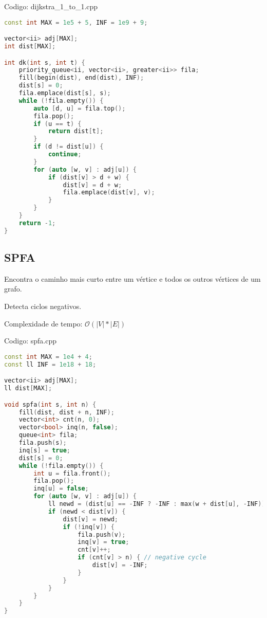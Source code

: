 \documentclass[10pt, a4paper, oneside]{book}
\begin{document}
Codigo: dijkstra\_1\_to\_1.cpp

\begin{lstlisting}[language=C++]
const int MAX = 1e5 + 5, INF = 1e9 + 9;

vector<ii> adj[MAX];
int dist[MAX];

int dk(int s, int t) {
    priority_queue<ii, vector<ii>, greater<ii>> fila;
    fill(begin(dist), end(dist), INF);
    dist[s] = 0;
    fila.emplace(dist[s], s);
    while (!fila.empty()) {
        auto [d, u] = fila.top();
        fila.pop();
        if (u == t) {
            return dist[t];
        }
        if (d != dist[u]) {
            continue;
        }
        for (auto [w, v] : adj[u]) {
            if (dist[v] > d + w) {
                dist[v] = d + w;
                fila.emplace(dist[v], v);
            }
        }
    }
    return -1;
}
\end{lstlisting}
\hfill

\subsection{SPFA}


Encontra o caminho mais curto entre um vértice e todos os outros vértices de um grafo.



Detecta ciclos negativos.



Complexidade de tempo: $\mathcal{O}(|V| * |E|)$

\hfill

Codigo: spfa.cpp

\begin{lstlisting}[language=C++]
const int MAX = 1e4 + 4;
const ll INF = 1e18 + 18;

vector<ii> adj[MAX];
ll dist[MAX];

void spfa(int s, int n) {
    fill(dist, dist + n, INF);
    vector<int> cnt(n, 0);
    vector<bool> inq(n, false);
    queue<int> fila;
    fila.push(s);
    inq[s] = true;
    dist[s] = 0;
    while (!fila.empty()) {
        int u = fila.front();
        fila.pop();
        inq[u] = false;
        for (auto [w, v] : adj[u]) {
            ll newd = (dist[u] == -INF ? -INF : max(w + dist[u], -INF));
            if (newd < dist[v]) {
                dist[v] = newd;
                if (!inq[v]) {
                    fila.push(v);
                    inq[v] = true;
                    cnt[v]++;
                    if (cnt[v] > n) { // negative cycle
                        dist[v] = -INF;
                    }
                }
            }
        }
    }
}
\end{lstlisting}
\hfill
\end{document}
